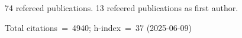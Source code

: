 74 refereed publications. 13 refeered publications as first author.

Total citations~=~4940; h-index~=~37 (2025-06-09)